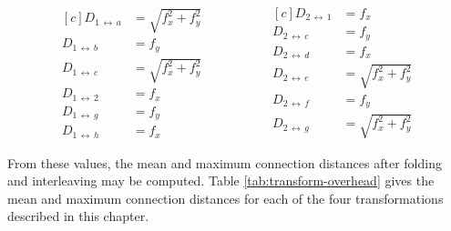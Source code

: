 			\begin{equation*}
				\begin{aligned}[c]
					D_{1\,\leftrightarrow{}\,a} &= \sqrt{f_x^2 + f_y^2} \\
					D_{1\,\leftrightarrow{}\,b} &= f_y \\
					D_{1\,\leftrightarrow{}\,c} &= \sqrt{f_x^2 + f_y^2} \\
					D_{1\,\leftrightarrow{}\,2} &= f_x \\
					D_{1\,\leftrightarrow{}\,g} &= f_y \\
					D_{1\,\leftrightarrow{}\,h} &= f_x
				\end{aligned}
				\hspace{2cm}
				\begin{aligned}[c]
					D_{2\,\leftrightarrow{}\,1} &= f_x \\
					D_{2\,\leftrightarrow{}\,c} &= f_y \\
					D_{2\,\leftrightarrow{}\,d} &= f_x \\
					D_{2\,\leftrightarrow{}\,e} &= \sqrt{f_x^2 + f_y^2} \\
					D_{2\,\leftrightarrow{}\,f} &= f_y \\
					D_{2\,\leftrightarrow{}\,g} &= \sqrt{f_x^2 + f_y^2}
				\end{aligned}
			\end{equation*}
			
			From these values, the mean and maximum connection distances after
			folding and interleaving may be computed. Table
			\ref{tab:transform-overhead} gives the mean and maximum connection
			distances for each of the four transformations described in this chapter.
			
